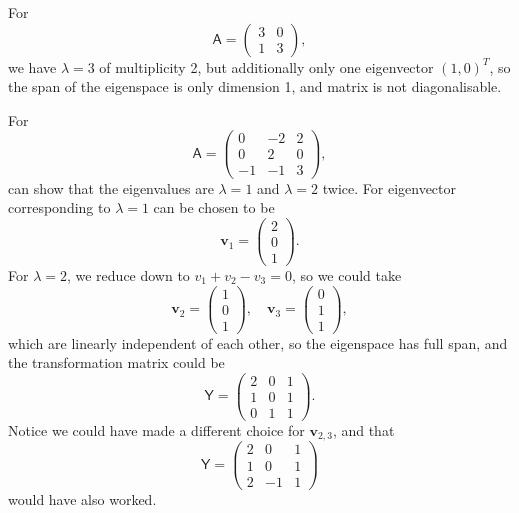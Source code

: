 \documentclass[letter-paper]{tufte-book}
\newenvironment{example}[1][Example]{\begin{trivlist}
\item[\hskip \labelsep {\bfseries #1}]}{\end{trivlist}}
\newcommand{\As}{{\mathsf{A}}}
\newcommand{\Ys}{{\mathsf{Y}}}
\newcommand{\vb}{{\boldsymbol{v}}}
\begin{document}
\begin{example}
  For
  \begin{equation*}
    \As = \begin{pmatrix}3 & 0 \\ 1 & 3\end{pmatrix},
  \end{equation*}
  we have $\lambda=3$ of multiplicity 2, but additionally only one eigenvector
  $(1,0)^T$, so the span of the eigenspace is only dimension 1, and matrix is
  not diagonalisable.
\end{example}

\begin{example}
  For
  \begin{equation*}
    \As = \begin{pmatrix}0 & -2 & 2 \\ 0 & 2 & 0 \\ -1 & -1 & 3\end{pmatrix},
  \end{equation*}
  can show that the eigenvalues are $\lambda=1$ and $\lambda=2$ twice. For
  eigenvector corresponding to $\lambda=1$ can be chosen to be
  \begin{equation*}
    \vb_1 = \begin{pmatrix}2 \\ 0 \\ 1\end{pmatrix}.
  \end{equation*}
  For $\lambda=2$, we reduce down to $v_1 + v_2 - v_3 = 0$, so we could take
  \begin{equation*}
    \vb_2 = \begin{pmatrix}1 \\ 0 \\ 1\end{pmatrix}, \quad \vb_3 = \begin{pmatrix}0 \\ 1 \\ 1\end{pmatrix},
  \end{equation*}
  which are linearly independent of each other, so the eigenspace has full span,
  and the transformation matrix could be
  \begin{equation*}
    \Ys = \begin{pmatrix}2 & 0 & 1 \\ 1 & 0 & 1 \\ 0 & 1 & 1\end{pmatrix}.
  \end{equation*}
  Notice we could have made a different choice for $\vb_{2,3}$, and
  that
  \begin{equation*}
    \Ys = \begin{pmatrix}2 & 0 & 1 \\ 1 & 0 & 1 \\ 2 & -1 & 1\end{pmatrix}
  \end{equation*}
  would have also worked.
\end{example}
\end{document}
